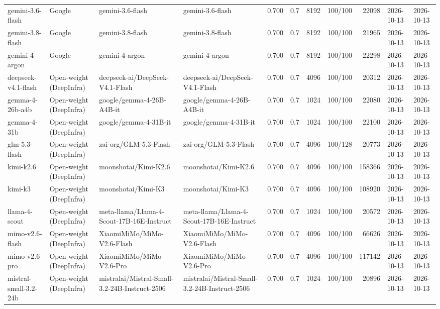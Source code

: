 \begin{table}
\begin{tabular}{llllrlrlrll}
gemini-3.6-flash & Google & gemini-3.6-flash & gemini-3.6-flash & 0.700 & 0.7 & 8192 & 100/100 & 22098 & 2026-10-13 & 2026-10-13 \\
gemini-3.8-flash & Google & gemini-3.8-flash & gemini-3.8-flash & 0.700 & 0.7 & 8192 & 100/100 & 21965 & 2026-10-13 & 2026-10-13 \\
gemini-4-argon & Google & gemini-4-argon & gemini-4-argon & 0.700 & 0.7 & 8192 & 100/100 & 22298 & 2026-10-13 & 2026-10-13 \\
deepseek-v4.1-flash & Open-weight (DeepInfra) & deepseek-ai/DeepSeek-V4.1-Flash & deepseek-ai/DeepSeek-V4.1-Flash & 0.700 & 0.7 & 4096 & 100/100 & 20312 & 2026-10-13 & 2026-10-13 \\
gemma-4-26b-a4b & Open-weight (DeepInfra) & google/gemma-4-26B-A4B-it & google/gemma-4-26B-A4B-it & 0.700 & 0.7 & 1024 & 100/100 & 22080 & 2026-10-13 & 2026-10-13 \\
gemma-4-31b & Open-weight (DeepInfra) & google/gemma-4-31B-it & google/gemma-4-31B-it & 0.700 & 0.7 & 1024 & 100/100 & 22100 & 2026-10-13 & 2026-10-13 \\
glm-5.3-flash & Open-weight (DeepInfra) & zai-org/GLM-5.3-Flash & zai-org/GLM-5.3-Flash & 0.700 & 0.7 & 4096 & 100/128 & 20773 & 2026-10-13 & 2026-10-13 \\
kimi-k2.6 & Open-weight (DeepInfra) & moonshotai/Kimi-K2.6 & moonshotai/Kimi-K2.6 & 0.700 & 0.7 & 4096 & 100/100 & 158366 & 2026-10-13 & 2026-10-13 \\
kimi-k3 & Open-weight (DeepInfra) & moonshotai/Kimi-K3 & moonshotai/Kimi-K3 & 0.700 & 0.7 & 4096 & 100/100 & 108920 & 2026-10-13 & 2026-10-13 \\
llama-4-scout & Open-weight (DeepInfra) & meta-llama/Llama-4-Scout-17B-16E-Instruct & meta-llama/Llama-4-Scout-17B-16E-Instruct & 0.700 & 0.7 & 1024 & 100/100 & 20572 & 2026-10-13 & 2026-10-13 \\
mimo-v2.6-flash & Open-weight (DeepInfra) & XiaomiMiMo/MiMo-V2.6-Flash & XiaomiMiMo/MiMo-V2.6-Flash & 0.700 & 0.7 & 4096 & 100/100 & 66626 & 2026-10-13 & 2026-10-13 \\
mimo-v2.6-pro & Open-weight (DeepInfra) & XiaomiMiMo/MiMo-V2.6-Pro & XiaomiMiMo/MiMo-V2.6-Pro & 0.700 & 0.7 & 4096 & 100/100 & 117142 & 2026-10-13 & 2026-10-13 \\
mistral-small-3.2-24b & Open-weight (DeepInfra) & mistralai/Mistral-Small-3.2-24B-Instruct-2506 & mistralai/Mistral-Small-3.2-24B-Instruct-2506 & 0.700 & 0.7 & 1024 & 100/100 & 20896 & 2026-10-13 & 2026-10-13 \\

\end{tabular}
\end{table}
